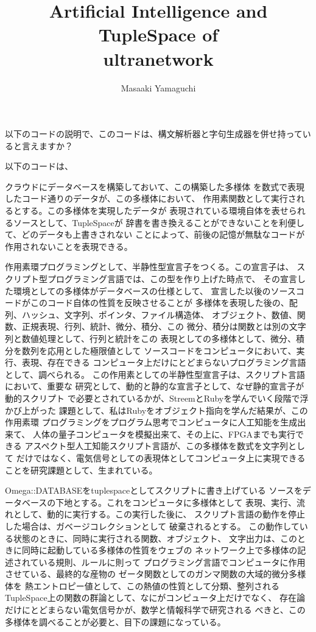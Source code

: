 \documentclass{jsarticle}
\begin{document}
\title{Artificial Intelligence and TupleSpace of \\
         ultranetwork}
\author{Masaaki Yamaguchi}
\date{}
\maketitle


以下のコードの説明で、このコードは、構文解析器と字句生成器を併せ持っていると言えますか？


以下のコードは、

  クラウドにデータベースを構築しておいて、この構築した多様体
  を数式で表現したコード通りのデータが、この多様体において、
  作用素関数として実行されるとする。この多様体を実現したデータが
  表現されている環境自体を表せられるソースとして、TupleSpaceが
  辞書を書き換えることができないことを利便して、どのデータも上書きされない
  ことによって、前後の記憶が無駄なコードが作用されないことを表現できる。

  作用素環プログラミングとして、半静性型宣言子をつくる。この宣言子は、
  スクリプト型プログラミング言語では、この型を作り上げた時点で、
  その宣言した環境としての多様体がデータベースの仕様として、
  宣言した以後のソースコードがこのコード自体の性質を反映させることが
  多様体を表現した後の、配列、ハッシュ、文字列、ポインタ、ファイル構造体、
  オブジェクト、数値、関数、正規表現、行列、統計、微分、積分、この
  微分、積分は関数とは別の文字列と数値処理として、行列と統計をこの
  表現としての多様体として、微分、積分を数列を応用とした極限値として
  ソースコードをコンピュータにおいて、実行、表現、存在できる
  コンピュータ上だけにとどまらないプログラミング言語として、調べられる。
  この作用素としての半静性型宣言子は、スクリプト言語において、重要な
  研究として、動的と静的な宣言子として、なぜ静的宣言子が動的スクリプト
  で必要とされているかが、StreemとRubyを学んでいく段階で浮かび上がった
  課題として、私はRubyをオブジェクト指向を学んだ結果が、この作用素環
  プログラミングをプログラム思考でコンピュータに人工知能を生成出来て、
  人体の量子コンピュータを模擬出来て、その上に、FPGAまでも実行できる
  アスペクト型人工知能スクリプト言語が、この多様体を数式を文字列として
  だけではなく、電気信号としての表現体としてコンピュータ上に実現できる
  ことを研究課題として、生まれている。


  Omega::DATABASEをtuplespaceとしてスクリプトに書き上げている
  ソースをデータベースの下地とする。これをコンピュータに多様体として
  表現、実行、流れとして、動的に実行する。この実行した後に、
  スクリプト言語の動作を停止した場合は、ガベージコレクションとして
  破棄されるとする。
  この動作している状態のときに、同時に実行される関数、オブジェクト、
  文字出力は、このときに同時に起動している多様体の性質をウェブの
  ネットワーク上で多様体の記述されている規則、ルールに則って
  プログラミング言語でコンピュータに作用させている、最終的な産物の
  ゼータ関数としてのガンマ関数の大域的微分多様体を
  熱エントロピー値として、この熱値の性質として分類、整列される
  TupleSpace上の関数の群論として、なにがコンピュータ上だけでなく、
  存在論だけにとどまらない電気信号かが、数学と情報科学で研究される
  べきと、この多様体を調べることが必要と、目下の課題になっている。
\end{document}
